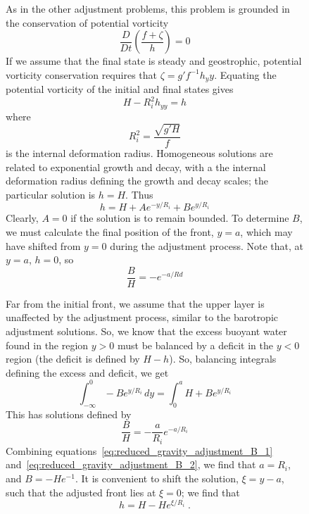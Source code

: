\documentclass[11pt]{report}
\numberwithin{equation}{section}
\begin{document}
\begin{figure}
As in the other adjustment problems, this problem is grounded in the conservation of potential vorticity
\begin{equation}
    \frac{D}{Dt}\left(\frac{f + \zeta}{h}\right) = 0
\end{equation}
If we assume that the final state is steady and geostrophic, potential vorticity conservation requires that $\zeta = g' f^{-1} h_yy$.  Equating the potential vorticity of the initial and final states gives
\begin{equation}
    H - R_i^2 h_{yy} = h 
\end{equation}
where
\begin{equation}
    R_i^2 = \frac{\sqrt{g' H}}{f}
\end{equation}
is the internal deformation radius.  Homogeneous solutions are related to exponential growth and decay, with a the internal deformation radius defining the growth and decay scales; the particular solution is $h=H$.  Thus
\begin{equation}
    h = H + A e^{-y/R_i} + B e^{y/R_i}
\end{equation}
Clearly, $A=0$ if the solution is to remain bounded.  To determine $B$, we must calculate the final position of the front, $y=a$, which may have shifted from $y=0$ during the adjustment process.  Note that, at $y=a$, $h=0$, so
\begin{equation}
    \label{eq:reduced_gravity_adjustment_B_1}
    \frac{B}{H} = -e^{-a/Rd}
\end{equation}

Far from the initial front, we assume that the upper layer is unaffected by the adjustment process, similar to the barotropic adjustment solutions.  So, we know that the excess buoyant water found in the region $y>0$ must be balanced by a deficit in the $y<0$ region (the deficit is defined by $H-h$).  So, balancing integrals defining the excess and deficit, we get
\begin{equation}
    \int_{-\infty}^0 -B e^{y/R_i} \, dy = \int_0^a H + B e^{y/R_i}
\end{equation}
This has solutions defined by
\begin{equation}
    \label{eq:reduced_gravity_adjustment_B_2}
    \frac{B}{H} = - \frac{a}{R_i} e^{-a/R_i}
\end{equation}
Combining equations~\ref{eq:reduced_gravity_adjustment_B_1} and~\ref{eq:reduced_gravity_adjustment_B_2}, we find that $a = R_i$, and $B = -H e^{-1}$.  It is convenient to shift the solution, $\xi = y-a$, such that the adjusted front lies at $\xi = 0$; we find that
\begin{equation}
    h = H - H e^{\xi/R_i} \; .
\end{equation}


\end{figure}
\end{document}
